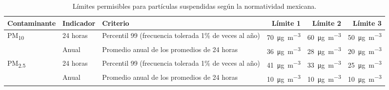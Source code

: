 \begin{table}[H]
\centering
\footnotesize
\caption{Límites permisibles para partículas suspendidas según la
normatividad mexicana.}
\label{tab:limites_permisibles}
\begin{tabularx}{\textwidth}{@{}l l Y r r r@{}}
\toprule
\textbf{Contaminante} & \textbf{Indicador} & \textbf{Criterio} &
\textbf{Límite 1} & \textbf{Límite 2} & \textbf{Límite 3} \\
\midrule
PM\textsubscript{10} & 24 horas &
Percentil 99 (frecuencia tolerada 1\% de veces al año) &
\SI{70}{\micro\gram\per\cubic\meter} &
\SI{60}{\micro\gram\per\cubic\meter} &
\SI{50}{\micro\gram\per\cubic\meter} \\
 & Anual & Promedio anual de los promedios de 24 horas &
\SI{36}{\micro\gram\per\cubic\meter} &
\SI{28}{\micro\gram\per\cubic\meter} &
\SI{20}{\micro\gram\per\cubic\meter} \\
\midrule
PM\textsubscript{2.5} & 24 horas &
Percentil 99 (frecuencia tolerada 1\% de veces al año) &
\SI{41}{\micro\gram\per\cubic\meter} &
\SI{33}{\micro\gram\per\cubic\meter} &
\SI{25}{\micro\gram\per\cubic\meter} \\
 & Anual & Promedio anual de los promedios de 24 horas &
\SI{10}{\micro\gram\per\cubic\meter} &
\SI{10}{\micro\gram\per\cubic\meter} &
\SI{10}{\micro\gram\per\cubic\meter} \\
\bottomrule
\end{tabularx}
\end{table}

